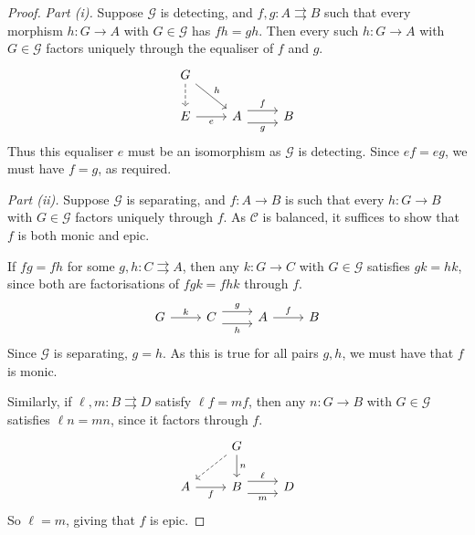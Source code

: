 \begin{proof}
    \emph{Part (i).}
    Suppose \( \mathcal G \) is detecting, and \( f, g : A \rightrightarrows B \) such that every morphism \( h : G \to A \) with \( G \in \mathcal G \) has \( fh = gh \).
    Then every such \( h : G \to A \) with \( G \in \mathcal G \) factors uniquely through the equaliser of \( f \) and \( g \).
    \[\begin{tikzcd}
        G \\
        E & A & B
        \arrow["h", from=1-1, to=2-2]
        \arrow["f", shift left=2, from=2-2, to=2-3]
        \arrow["g"', shift right=2, from=2-2, to=2-3]
        \arrow["e"', from=2-1, to=2-2]
        \arrow[dashed, from=1-1, to=2-1]
    \end{tikzcd}\]
    Thus this equaliser \( e \) must be an isomorphism as \( \mathcal G \) is detecting.
    Since \( ef = eg \), we must have \( f = g \), as required.

    \emph{Part (ii).}
    Suppose \( \mathcal G \) is separating, and \( f : A \to B \) is such that every \( h : G \to B \) with \( G \in \mathcal G \) factors uniquely through \( f \).
    As \( \mathcal C \) is balanced, it suffices to show that \( f \) is both monic and epic.

    If \( fg = fh \) for some \( g, h : C \rightrightarrows A \), then any \( k : G \to C \) with \( G \in \mathcal G \) satisfies \( gk = hk \), since both are factorisations of \( fgk = fhk \) through \( f \).
    \[\begin{tikzcd}
        G & C & A & B
        \arrow["g", shift left=2, from=1-2, to=1-3]
        \arrow["h"', shift right=2, from=1-2, to=1-3]
        \arrow["k", from=1-1, to=1-2]
        \arrow["f", from=1-3, to=1-4]
    \end{tikzcd}\]
    Since \( \mathcal G \) is separating, \( g = h \).
    As this is true for all pairs \( g, h \), we must have that \( f \) is monic.

    Similarly, if \( \ell, m : B \rightrightarrows D \) satisfy \( \ell f = mf \), then any \( n : G \to B \) with \( G \in \mathcal G \) satisfies \( \ell n = m n \), since it factors through \( f \).
    \[\begin{tikzcd}
        & G \\
        A & B & D
        \arrow["\ell", shift left=2, from=2-2, to=2-3]
        \arrow["m"', shift right=2, from=2-2, to=2-3]
        \arrow["f"', from=2-1, to=2-2]
        \arrow["n", from=1-2, to=2-2]
        \arrow[dashed, from=1-2, to=2-1]
    \end{tikzcd}\]
    So \( \ell = m \), giving that \( f \) is epic.
\end{proof}
